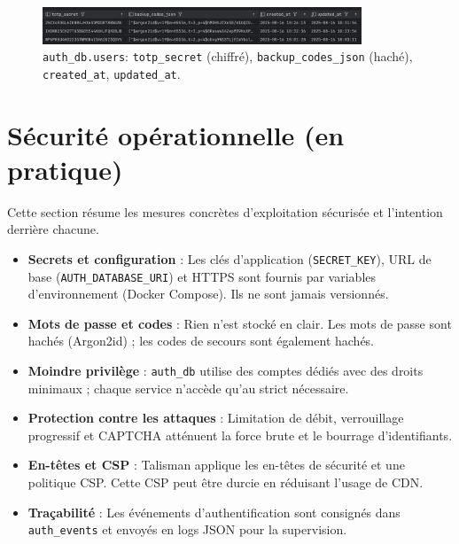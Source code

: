 \begin{figure}[H]
  \centering
  \includegraphics[width=0.85\textwidth]{../figures/chap10/auth_db3.png}
  \caption{\texttt{auth\_db.users}: \texttt{totp\_secret} (chiffré), \texttt{backup\_codes\_json} (haché), \texttt{created\_at}, \texttt{updated\_at}.}
\end{figure}

\section{Sécurité opérationnelle (en pratique)}
\noindent Cette section résume les mesures concrètes d'exploitation sécurisée et l'intention derrière chacune.

\begin{itemize}
  \item \textbf{Secrets et configuration} : Les clés d'application (\texttt{SECRET\_KEY}), URL de base (\texttt{AUTH\_DATABASE\_URI}) et HTTPS sont fournis par variables d'environnement (Docker Compose). Ils ne sont jamais versionnés.
  \item \textbf{Mots de passe et codes} : Rien n'est stocké en clair. Les mots de passe sont hachés (Argon2id) ; les codes de secours sont également hachés.
  \item \textbf{Moindre privilège} : \texttt{auth\_db} utilise des comptes dédiés avec des droits minimaux ; chaque service n'accède qu'au strict nécessaire.
  \item \textbf{Protection contre les attaques} : Limitation de débit, verrouillage progressif et CAPTCHA atténuent la force brute et le bourrage d'identifiants.
  \item \textbf{En-têtes et CSP} : Talisman applique les en-têtes de sécurité et une politique CSP. Cette CSP peut être durcie en réduisant l'usage de CDN.
  \item \textbf{Traçabilité} : Les événements d'authentification sont consignés dans \texttt{auth\_events} et envoyés en logs JSON pour la supervision.
\end{itemize}





